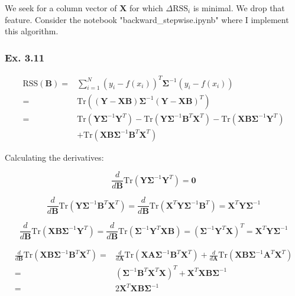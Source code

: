\documentclass{article}
\begin{document}
We seek for a column vector of $\mathbf{X}$ for which $\Delta\text{RSS}_i$ is minimal. We drop that feature. Consider the notebook "backward\_stepwise.ipynb" where I implement this algorithm.

\subsubsection{Ex. 3.11}

\[
\begin{split}
\text{RSS}(\mathbf{B}) =& \sum_{i=1}^{N} (y_i -f(x_i))^T \mathbf{\Sigma}^{-1} (y_i - f(x_i))\\
=& \text{Tr}\left( (\mathbf{Y} - \mathbf{X} \mathbf{B}) \mathbf{\Sigma}^{-1} (\mathbf{Y} - \mathbf{X} \mathbf{B})^T \right)\\
=&\text{Tr}(\mathbf{Y} \mathbf{\Sigma}^{-1} \mathbf{Y}^T) - \text{Tr}(\mathbf{Y} \mathbf{\Sigma}^{-1} \mathbf{B}^T \mathbf{X}^T) - \text{Tr}(\mathbf{X}\mathbf{B}\mathbf{\Sigma}^{-1}\mathbf{Y}^T)\\
&+ \text{Tr}(\mathbf{X} \mathbf{B} \mathbf{\Sigma}^{-1} \mathbf{B}^T \mathbf{X}^T)
\end{split}
\]

Calculating the derivatives:

\[
\frac{d}{d\mathbf{B}}\text{Tr}(\mathbf{Y} \mathbf{\Sigma}^{-1} \mathbf{Y}^T) = \mathbf{0}
\]

\[
\frac{d}{d\mathbf{B}}\text{Tr}(\mathbf{Y} \mathbf{\Sigma}^{-1} \mathbf{B}^T \mathbf{X}^T) = \frac{d}{d\mathbf{B}}\text{Tr}(\mathbf{X}^T \mathbf{Y} \mathbf{\Sigma}^{-1} \mathbf{B}^T) = \mathbf{X}^T \mathbf{Y} \mathbf{\Sigma}^{-1}
\]

\[
\frac{d}{d\mathbf{B}}\text{Tr}(\mathbf{X}\mathbf{B}\mathbf{\Sigma}^{-1}\mathbf{Y}^T) = \frac{d}{d\mathbf{B}}\text{Tr}(\mathbf{\Sigma}^{-1}\mathbf{Y}^T\mathbf{X}\mathbf{B}) = (\mathbf{\Sigma}^{-1}\mathbf{Y}^T\mathbf{X})^T = \mathbf{X}^T \mathbf{Y} \mathbf{\Sigma}^{-1}
\]

\[
\begin{split}
\frac{d}{d\mathbf{B}}\text{Tr}(\mathbf{X} \mathbf{B} \mathbf{\Sigma}^{-1} \mathbf{B}^T \mathbf{X}^T) =& \frac{d}{d\mathbf{A}}\text{Tr}(\mathbf{X} \mathbf{A} \mathbf{\Sigma}^{-1} \mathbf{B}^T \mathbf{X}^T) + \frac{d}{d\mathbf{A}}\text{Tr}(\mathbf{X} \mathbf{B} \mathbf{\Sigma}^{-1} \mathbf{A}^T \mathbf{X}^T)\\
=& (\mathbf{\Sigma}^{-1} \mathbf{B}^T \mathbf{X}^T \mathbf{X})^T + \mathbf{X}^T \mathbf{X} \mathbf{B} \mathbf{\Sigma}^{-1}\\
=& 2\mathbf{X}^T \mathbf{X} \mathbf{B} \mathbf{\Sigma}^{-1}
\end{split}
\]
\end{document}
